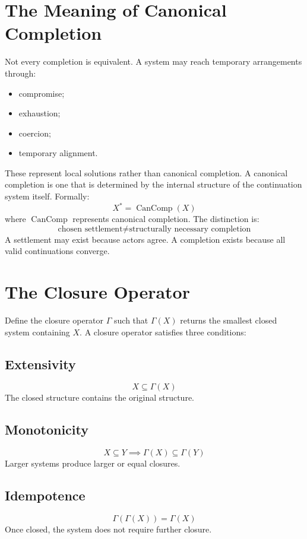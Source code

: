 \documentclass[11pt,openany]{book}
\theoremstyle{plain}
\theoremstyle{definition}
\begin{document}
\section{The Meaning of Canonical Completion}

Not every completion is equivalent. A system may reach temporary arrangements through:
\begin{itemize}
\item compromise;
\item exhaustion;
\item coercion;
\item temporary alignment.
\end{itemize}
These represent local solutions rather than canonical completion. A canonical completion is one that is determined by the internal structure of the continuation system itself. Formally:
\[
X^* = \operatorname{CanComp}(X)
\]
where \(\operatorname{CanComp}\) represents canonical completion. The distinction is:
\[
\text{chosen settlement} \neq \text{structurally necessary completion}
\]
A settlement may exist because actors agree. A completion exists because all valid continuations converge.

\section{The Closure Operator}

Define the closure operator \(\Gamma\) such that \(\Gamma(X)\) returns the smallest closed system containing \(X\). A closure operator satisfies three conditions:

\subsection{Extensivity}
\[
X \subseteq \Gamma(X)
\]
The closed structure contains the original structure.

\subsection{Monotonicity}
\[
X \subseteq Y \implies \Gamma(X) \subseteq \Gamma(Y)
\]
Larger systems produce larger or equal closures.

\subsection{Idempotence}
\[
\Gamma(\Gamma(X)) = \Gamma(X)
\]
Once closed, the system does not require further closure.
\end{document}
